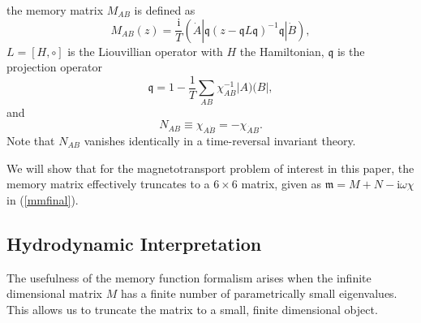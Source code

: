\documentclass[10pt, oneside]{book}
\begin{document}
\begin{doublespace}
\begin{equation}
\end{equation}  the memory matrix $M_{AB}$ is defined as \begin{equation}
M_{AB}(z) = \frac{\mathrm{i}}{T}\left(\dot{A}\left| \mathfrak{q}(z-\mathfrak{q}L\mathfrak{q})^{-1}\mathfrak{q}\left|\dot{B}\right)\right.\right.,  \label{memmatrix}
\end{equation}$L = [H,\circ]$ is the Liouvillian operator with $H$ the Hamiltonian, $\mathfrak{q}$ is the projection operator \begin{equation}
\mathfrak{q} = 1-\frac{1}{T}\sum_{AB} \chi_{AB}^{-1} |A)(B|,
\end{equation}and\begin{equation}
N_{AB} \equiv \chi_{A\dot{B}} = - \chi_{\dot{A}B}.
\end{equation}Note that $N_{AB}$ vanishes identically in a time-reversal invariant theory.

We will show that for the magnetotransport problem of interest in this paper, the memory matrix effectively truncates to a $6\times 6$ matrix, given as $\mathfrak{m} = M+N-\mathrm{i}\omega\chi$ in (\ref{mmfinal}).

\subsection{Hydrodynamic Interpretation}
The usefulness of the memory function formalism  arises when the infinite dimensional matrix $M$ has a finite number of  parametrically small eigenvalues.   This allows us to truncate the matrix to a small, finite dimensional object.


\end{doublespace}
\end{document}
